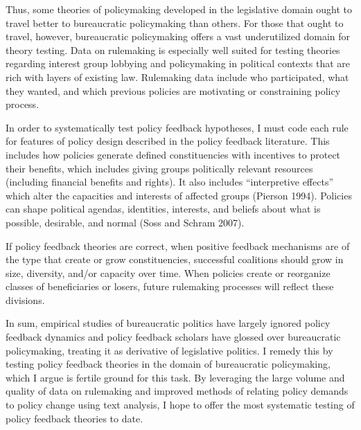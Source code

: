 Thus, some theories of policymaking developed in the legislative domain ought to travel better to bureaucratic policymaking than others. For those that ought to travel, however, bureaucratic policymaking offers a vast underutilized domain for theory testing. Data on rulemaking is especially well suited for testing theories regarding interest group lobbying and policymaking in political contexts that are rich with layers of existing law. Rulemaking data include who participated, what they wanted, and which previous policies are motivating or constraining policy process. 


In order to systematically test policy feedback hypotheses, I must code each rule %
for features of policy design described in the policy feedback literature. %
This includes how policies generate defined constituencies with incentives to protect their benefits, which includes giving groups politically relevant resources (including financial benefits and rights). It also includes ``interpretive effects'' which alter the capacities and interests of affected groups (Pierson 1994). Policies can shape political agendas, identities, interests, and beliefs about what is possible, desirable, and normal (Soss and Schram 2007).

If policy feedback theories are correct, when positive feedback mechanisms are of the type that create or grow constituencies, successful coalitions should grow in size, diversity, and/or capacity over time. When policies create or reorganize classes of beneficiaries or losers, future rulemaking processes will reflect these divisions. %

In sum, empirical studies of bureaucratic politics have largely ignored policy feedback dynamics and policy feedback scholars have glossed over bureaucratic policymaking, treating it as derivative of legislative politics. I remedy this by testing policy feedback theories in the domain of bureaucratic policymaking, which I argue is fertile ground for this task. By leveraging the large volume and quality of data on rulemaking and improved methods of relating policy demands to policy change using text analysis, I hope to offer the most systematic testing of policy feedback theories to date.




